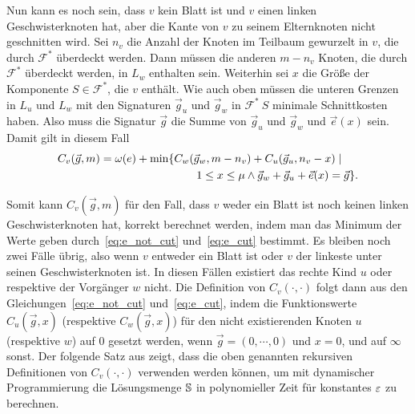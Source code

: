 Nun kann es noch sein, dass $v$ kein Blatt ist und $v$ einen linken Geschwisterknoten hat, aber die Kante von $v$ zu seinem Elternknoten nicht geschnitten wird.
Sei $n_v$ die Anzahl der Knoten im Teilbaum gewurzelt in $v$, die durch $\mathcal{F}^*$ überdeckt werden.
Dann müssen die anderen $m - n_v$ Knoten, die durch $\mathcal{F}^*$ überdeckt werden, in $L_w$ enthalten sein.
Weiterhin sei $x$ die Größe der Komponente $S \in \mathcal{F}^*$, die $v$ enthält.
Wie auch oben müssen die unteren Grenzen in $L_u$ und $L_w$ mit den Signaturen $\vec{g}_u$ und $\vec{g}_w$ in $\mathcal{F}^* \ {S}$ minimale Schnittkosten haben.
Also muss die Signatur $\vec{g}$ die Summe von $\vec{g}_u$ und $\vec{g}_w$ und $\vec{e}(x)$ sein.
Damit gilt in diesem Fall
\begin{equation} \label{eq:e_cut}
    \begin{aligned}
        C_v(\vec{g}, m) = \omega(e) + \min \{ & C_w(\vec{g}_w, m - n_v) + C_u(\vec{g}_u, n_v - x) \mid \\ & \qquad 1 \leq x \leq \mu \land \vec{g}_w + \vec{g}_u + \vec{e}(x) = \vec{g} \}.
    \end{aligned}
\end{equation}

Somit kann $C_v(\vec{g}, m)$ für den Fall, dass $v$ weder ein Blatt ist noch keinen linken Geschwisterknoten hat, korrekt berechnet werden, indem man das Minimum der Werte geben durch~\eqref{eq:e_not_cut} und~\eqref{eq:e_cut} bestimmt.
Es bleiben noch zwei Fälle übrig, also wenn $v$ entweder ein Blatt ist oder $v$ der linkeste unter seinen Geschwisterknoten ist.
In diesen Fällen existiert das rechte Kind $u$ oder respektive der Vorgänger $w$ nicht.
Die Definition von $C_v(\cdot, \cdot)$ folgt dann aus den Gleichungen~\eqref{eq:e_not_cut} und~\eqref{eq:e_cut}, indem die Funktionswerte $C_u(\vec{g}, x)$ (respektive $C_w(\vec{g}, x)$) für den nicht existierenden Knoten $u$ (respektive $w$) auf $0$ gesetzt werden, wenn $\vec{g} = (0, \cdots, 0)$ und $x = 0$, und auf $\infty$ sonst. 
Der folgende Satz aus \parencite{ff13} zeigt, dass die oben genannten rekursiven Definitionen von $C_v(\cdot, \cdot)$ verwenden werden können, um mit dynamischer Programmierung die Lösungsmenge $\mathbb{S}$ in polynomieller Zeit für konstantes $\varepsilon$ zu berechnen. \\

